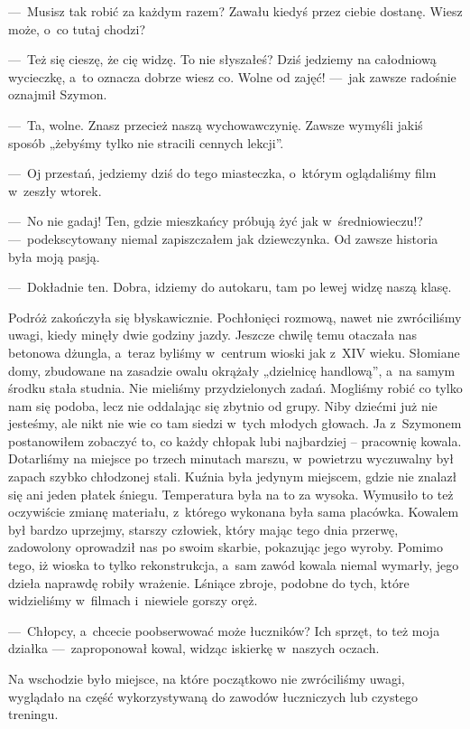 ---~Musisz tak robić za każdym razem? Zawału kiedyś przez ciebie dostanę. Wiesz może, o~co tutaj chodzi?

---~Też się cieszę, że cię widzę. To nie słyszałeś? Dziś jedziemy na całodniową wycieczkę, a~to oznacza dobrze wiesz co. Wolne od zajęć! ---~jak zawsze radośnie oznajmił Szymon.

---~Ta, wolne. Znasz przecież naszą wychowawczynię. Zawsze wymyśli jakiś sposób „żebyśmy tylko nie stracili cennych lekcji”.

---~Oj przestań, jedziemy dziś do tego miasteczka, o~którym oglądaliśmy film w~zeszły wtorek.

---~No nie gadaj! Ten, gdzie mieszkańcy próbują żyć jak w~średniowieczu!? ---~podekscytowany niemal zapiszczałem jak dziewczynka. Od zawsze historia była moją pasją.

---~Dokładnie ten. Dobra, idziemy do autokaru, tam po lewej widzę naszą klasę.

Podróż zakończyła się błyskawicznie. Pochłonięci rozmową, nawet nie zwróciliśmy uwagi, kiedy minęły dwie godziny jazdy. Jeszcze chwilę temu otaczała nas betonowa dżungla, a~teraz byliśmy w~centrum wioski jak z~XIV wieku. Słomiane domy, zbudowane na zasadzie owalu okrążały „dzielnicę handlową”, a~na samym środku stała studnia. Nie mieliśmy przydzielonych zadań. Mogliśmy robić co tylko nam się podoba, lecz nie oddalając się zbytnio od grupy. Niby dziećmi już nie jesteśmy, ale nikt nie wie co tam siedzi w~tych młodych głowach. Ja z~Szymonem postanowiłem zobaczyć to, co każdy chłopak lubi najbardziej -- pracownię kowala. Dotarliśmy na miejsce po trzech minutach marszu, w~powietrzu wyczuwalny był zapach szybko chłodzonej stali. Kuźnia była jedynym miejscem, gdzie nie znalazł się ani jeden płatek śniegu. Temperatura była na to za wysoka. Wymusiło to też oczywiście zmianę materiału, z~którego wykonana była sama placówka. Kowalem był bardzo uprzejmy, starszy człowiek, który mając tego dnia przerwę, zadowolony oprowadził nas po swoim skarbie, pokazując jego wyroby. Pomimo tego, iż wioska to tylko rekonstrukcja, a~sam zawód kowala niemal wymarły, jego dzieła naprawdę robiły wrażenie. Lśniące zbroje, podobne do tych, które widzieliśmy w~filmach i~niewiele gorszy oręż.

---~Chłopcy, a~chcecie poobserwować może łuczników? Ich sprzęt, to też moja działka ---~zaproponował kowal, widząc iskierkę w~naszych oczach.

Na wschodzie było miejsce, na które początkowo nie zwróciliśmy uwagi, wyglądało na część wykorzystywaną do zawodów łuczniczych lub czystego treningu.

